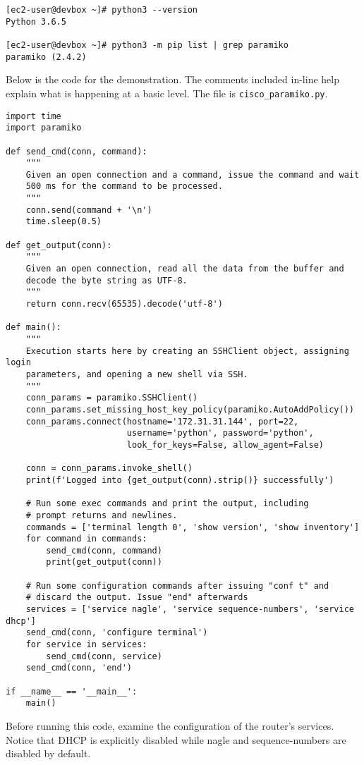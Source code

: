 \begin{verbatim}
[ec2-user@devbox ~]# python3 --version
Python 3.6.5

[ec2-user@devbox ~]# python3 -m pip list | grep paramiko
paramiko (2.4.2)
\end{verbatim}

Below is the code for the demonstration. The comments included in-line help
explain what is happening at a basic level. The file is \verb|cisco_paramiko.py|.

\begin{verbatim}
import time
import paramiko

def send_cmd(conn, command):
    """
    Given an open connection and a command, issue the command and wait
    500 ms for the command to be processed.
    """
    conn.send(command + '\n')
    time.sleep(0.5)

def get_output(conn):
    """
    Given an open connection, read all the data from the buffer and
    decode the byte string as UTF-8.
    """
    return conn.recv(65535).decode('utf-8')

def main():
    """
    Execution starts here by creating an SSHClient object, assigning login
    parameters, and opening a new shell via SSH.
    """
    conn_params = paramiko.SSHClient()
    conn_params.set_missing_host_key_policy(paramiko.AutoAddPolicy())
    conn_params.connect(hostname='172.31.31.144', port=22,
                        username='python', password='python',
                        look_for_keys=False, allow_agent=False)

    conn = conn_params.invoke_shell()
    print(f'Logged into {get_output(conn).strip()} successfully')

    # Run some exec commands and print the output, including
    # prompt returns and newlines.
    commands = ['terminal length 0', 'show version', 'show inventory']
    for command in commands:
        send_cmd(conn, command)
        print(get_output(conn))

    # Run some configuration commands after issuing "conf t" and
    # discard the output. Issue "end" afterwards
    services = ['service nagle', 'service sequence-numbers', 'service dhcp']
    send_cmd(conn, 'configure terminal')
    for service in services:
        send_cmd(conn, service)
    send_cmd(conn, 'end')

if __name__ == '__main__':
    main()
\end{verbatim}

Before running this code, examine the configuration of the router's services.
Notice that DHCP is explicitly disabled while nagle and sequence-numbers are
disabled by default.


